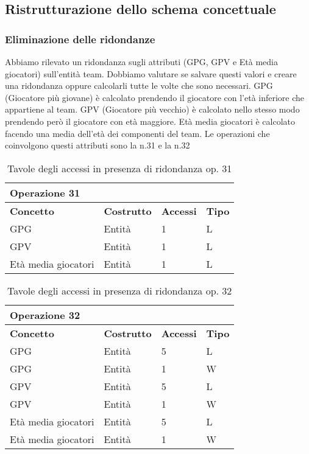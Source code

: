 \documentclass{article}
\begin{document}
\subsection{Ristrutturazione dello schema concettuale}

\subsubsection{Eliminazione delle ridondanze}
Abbiamo rilevato un ridondanza sugli attributi (GPG, GPV e Età media giocatori) sull'entità team. Dobbiamo valutare se salvare questi valori e creare una ridondanza oppure calcolarli tutte le volte che sono necessari. GPG (Giocatore più giovane) è calcolato prendendo il giocatore con l'età inferiore che appartiene al team. GPV (Giocatore più vecchio) è calcolato nello stesso modo prendendo però il giocatore con età maggiore. Età media giocatori è calcolato facendo una media dell'età dei componenti del team. Le operazioni che coinvolgono questi attributi sono la n.31 e la n.32 \\

\begin{table}[H]
    \centering
    \begin{tabularx}{\textwidth}{|X|X|X|X|}
        \hline 
        \textbf{Operazione 31} & & & \\ \hline
        \textbf{Concetto} & \textbf{Costrutto} & \textbf{Accessi} & \textbf{Tipo} \\ \hline
        GPG & Entità & 1 & L \\ \hline
        GPV & Entità & 1 & L \\ \hline
        Età media giocatori & Entità & 1 & L \\ \hline
    \end{tabularx}
    \caption{Tavole degli accessi in presenza di ridondanza op. 31}
\end{table}


\begin{table}[H]
    \centering
    \begin{tabularx}{\textwidth}{|X|X|X|X|}
        \hline
        \textbf{Operazione 32} & & & \\ \hline
        \textbf{Concetto} & \textbf{Costrutto} & \textbf{Accessi} & \textbf{Tipo} \\ \hline
        GPG & Entità & 5 & L \\ \hline
        GPG & Entità & 1 & W \\ \hline
        GPV & Entità & 5 & L \\ \hline
        GPV & Entità & 1 & W \\ \hline
        Età media giocatori & Entità & 5 & L \\ \hline
        Età media giocatori & Entità & 1 & W \\ \hline
    \end{tabularx}
    \caption{Tavole degli accessi in presenza di ridondanza op. 32}
\end{table}
\end{document}
